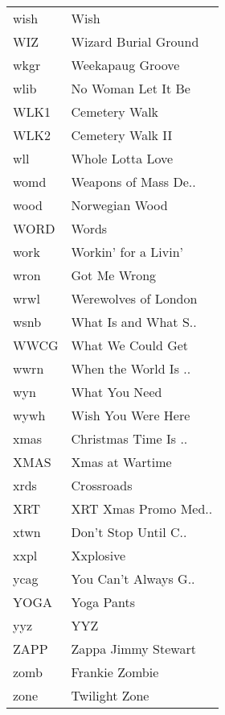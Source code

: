 \begin{supertabular}{ll}
 wish &                  Wish \\
  WIZ &  Wizard Burial Ground \\
 wkgr &      Weekapaug Groove \\
 wlib &    No Woman Let It Be \\
 WLK1 &         Cemetery Walk \\
 WLK2 &      Cemetery Walk II \\
  wll &      Whole Lotta Love \\
 womd &  Weapons of Mass De.. \\
 wood &        Norwegian Wood \\
 WORD &                 Words \\
 work &  Workin' for a Livin' \\
 wron &          Got Me Wrong \\
 wrwl &  Werewolves of London \\
 wsnb &  What Is and What S.. \\
 WWCG &     What We Could Get \\
 wwrn &  When the World Is .. \\
  wyn &         What You Need \\
 wywh &    Wish You Were Here \\
 xmas &  Christmas Time Is .. \\
 XMAS &       Xmas at Wartime \\
 xrds &            Crossroads \\
  XRT &  XRT Xmas Promo Med.. \\
 xtwn &  Don't Stop Until C.. \\
 xxpl &             Xxplosive \\
 ycag &  You Can't Always G.. \\
 YOGA &            Yoga Pants \\
  yyz &                   YYZ \\
 ZAPP &   Zappa Jimmy Stewart \\
 zomb &        Frankie Zombie \\
 zone &         Twilight Zone \\
\end{supertabular}
